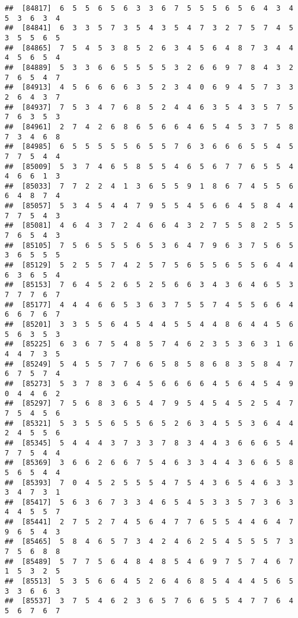 \documentclass[
]{book}
\begin{document}
\begin{verbatim}
##  [84817]  6  5  5  6  5  6  3  3  6  7  5  5  5  6  5  6  4  3  4  5  3  6  3  4
##  [84841]  6  3  3  5  7  3  5  4  3  5  4  7  3  2  7  5  7  4  5  3  5  5  6  5
##  [84865]  7  5  4  5  3  8  5  2  6  3  4  5  6  4  8  7  3  4  4  4  5  6  5  4
##  [84889]  5  3  3  6  6  5  5  5  5  3  2  6  6  9  7  8  4  3  2  7  6  5  4  7
##  [84913]  4  5  6  6  6  6  3  5  2  3  4  0  6  9  4  5  7  3  3  2  6  4  3  7
##  [84937]  7  5  3  4  7  6  8  5  2  4  4  6  3  5  4  3  5  7  5  7  6  3  5  3
##  [84961]  2  7  4  2  6  8  6  5  6  6  4  6  5  4  5  3  7  5  8  7  3  4  6  8
##  [84985]  6  5  5  5  5  5  6  5  5  7  6  3  6  6  6  5  5  4  5  7  7  5  4  4
##  [85009]  5  3  7  4  6  5  8  5  5  4  6  5  6  7  7  6  5  5  4  4  6  6  1  3
##  [85033]  7  7  2  2  4  1  3  6  5  5  9  1  8  6  7  4  5  5  6  6  4  8  7  4
##  [85057]  5  3  4  5  4  4  7  9  5  5  4  5  6  6  4  5  8  4  4  7  7  5  4  3
##  [85081]  4  6  4  3  7  2  4  6  6  4  3  2  7  5  5  8  2  5  5  7  6  5  4  3
##  [85105]  7  5  6  5  5  5  6  5  3  6  4  7  9  6  3  7  5  6  5  3  6  5  5  5
##  [85129]  5  2  5  5  7  4  2  5  7  5  6  5  5  6  5  5  6  4  4  6  3  6  5  4
##  [85153]  7  6  4  5  2  6  5  2  5  6  6  3  4  3  6  4  6  5  3  7  7  7  6  7
##  [85177]  4  4  4  6  6  5  3  6  3  7  5  5  7  4  5  5  6  6  4  6  6  7  6  7
##  [85201]  3  3  5  5  6  4  5  4  4  5  5  4  4  8  6  4  4  5  6  5  6  3  5  3
##  [85225]  6  3  6  7  5  4  8  5  7  4  6  2  3  5  3  6  3  1  6  4  4  7  3  5
##  [85249]  5  4  5  5  7  7  6  6  5  8  5  8  6  8  3  5  8  4  7  6  7  5  7  4
##  [85273]  5  3  7  8  3  6  4  5  6  6  6  6  4  5  6  4  5  4  9  0  4  4  6  2
##  [85297]  7  5  6  8  3  6  5  4  7  9  5  4  5  4  5  2  5  4  7  7  5  4  5  6
##  [85321]  5  3  5  5  6  5  5  6  5  2  6  3  4  5  5  3  6  4  4  2  4  5  5  6
##  [85345]  5  4  4  4  3  7  3  3  7  8  3  4  4  3  6  6  6  5  4  7  7  5  4  4
##  [85369]  3  6  6  2  6  6  7  5  4  6  3  3  4  4  3  6  6  5  8  5  6  5  4  4
##  [85393]  7  0  4  5  2  5  5  5  4  7  5  4  3  6  5  4  6  3  3  3  4  7  3  1
##  [85417]  5  6  3  6  7  3  3  4  6  5  4  5  3  3  5  7  3  6  3  4  4  5  5  7
##  [85441]  2  7  5  2  7  4  5  6  4  7  7  6  5  5  4  4  6  4  7  9  6  5  4  3
##  [85465]  5  8  4  6  5  7  3  4  2  4  6  2  5  4  5  5  5  7  3  7  5  6  8  8
##  [85489]  5  7  7  5  6  4  8  4  8  5  4  6  9  7  5  7  4  6  7  1  5  3  2  5
##  [85513]  5  3  5  6  6  4  5  2  6  4  6  8  5  4  4  4  5  6  5  3  3  6  6  3
##  [85537]  3  7  5  4  6  2  3  6  5  7  6  6  5  5  4  7  7  6  4  5  6  7  6  7

\end{verbatim}
\end{document}
